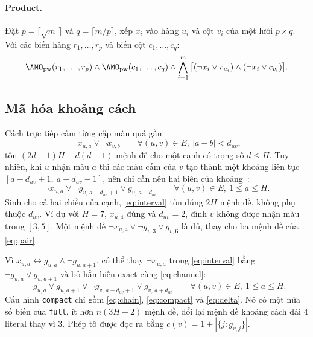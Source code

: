 \paragraph{Product.} Đặt $p=\lceil\sqrt m\,\rceil$ và $q=\lceil m/p\rceil$, xếp $x_i$ vào hàng $u_i$ và cột $v_i$ của một lưới $p\times q$. Với các biến hàng $r_1,\dots,r_p$ và biến cột $c_1,\dots,c_q$:
\begin{equation}
\AMO_{\mathrm{pw}}(r_1,\dots,r_p)\wedge\AMO_{\mathrm{pw}}(c_1,\dots,c_q)\wedge\bigwedge_{i=1}^{m}\big[(\neg x_i\vee r_{u_i})\wedge(\neg x_i\vee c_{v_i})\big]. \label{eq:prod}
\end{equation}

\begin{table}[width=\linewidth,pos=t]
\caption{Kích thước của một ràng buộc AMO trên $m$ literal. Bốn cột cuối ghi ``số biến phụ / số mệnh đề'', do chương trình sinh ra và trùng với công thức ở mọi $2\le m\le 200$.}
\label{tab:amo}
\centering\small

\end{table}

\subsection{Mã hóa khoảng cách}\label{sec:dist}

Cách trực tiếp cấm từng cặp màu quá gần:
\begin{equation}
\neg x_{u,a}\vee\neg x_{v,b}\qquad\forall (u,v)\in E,\ |a-b|<d_{uv}, \label{eq:pair}
\end{equation}
tốn $(2d-1)H-d(d-1)$ mệnh đề cho một cạnh có trọng số $d\le H$. Tuy nhiên, khi $u$ nhận màu $a$ thì các màu cấm của $v$ tạo thành một khoảng liên tục $[a-d_{uv}+1,\ a+d_{uv}-1]$, nên chỉ cần nêu hai biên của khoảng~\citep{nguyen2026bcp}:
\begin{equation}
\neg x_{u,a}\vee\neg g_{v,\,a-d_{uv}+1}\vee g_{v,\,a+d_{uv}}\qquad\forall (u,v)\in E,\ 1\le a\le H. \label{eq:interval}
\end{equation}
Sinh cho cả hai chiều của cạnh, \eqref{eq:interval} tốn đúng $2H$ mệnh đề, không phụ thuộc $d_{uv}$. Ví dụ với $H=7$, $x_{u,4}$ đúng và $d_{uv}=2$, đỉnh $v$ không được nhận màu trong $[3,5]$. Một mệnh đề $\neg x_{u,4}\vee\neg g_{v,3}\vee g_{v,6}$ là đủ, thay cho ba mệnh đề của \eqref{eq:pair}.

Vì $x_{u,a}\leftrightarrow g_{u,a}\wedge\neg g_{u,a+1}$, có thể thay $\neg x_{u,a}$ trong \eqref{eq:interval} bằng $\neg g_{u,a}\vee g_{u,a+1}$ và bỏ hẳn biến exact cùng \eqref{eq:channel}:
\begin{equation}
\neg g_{u,a}\vee g_{u,a+1}\vee\neg g_{v,\,a-d_{uv}+1}\vee g_{v,\,a+d_{uv}}\qquad\forall (u,v)\in E,\ 1\le a\le H. \label{eq:compact}
\end{equation}
Cấu hình \texttt{compact} chỉ gồm \eqref{eq:chain}, \eqref{eq:compact} và \eqref{eq:delta}. Nó có một nửa số biến của \texttt{full}, ít hơn $n(3H-2)$ mệnh đề, đổi lại mệnh đề khoảng cách dài 4 literal thay vì 3. Phép tô được đọc ra bằng $c(v)=1+|\{j: g_{v,j}\}|$.

